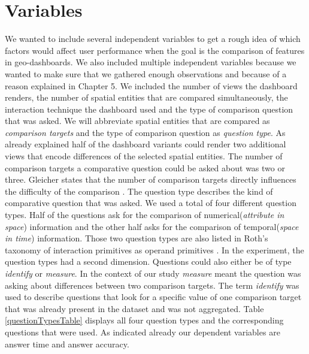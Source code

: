 \section{Variables}
We wanted to include several independent variables to get a rough idea of which factors would affect user performance when the goal
is the comparison of features in geo-dashboards. We also included multiple independent variables because we wanted to make sure that we gathered
enough observations and because of a reason explained in Chapter 5.
We included the number of views the dashboard renders, the number of spatial entities that are compared simultaneously,
the interaction technique the dashboard used and the type of comparison question that was asked. We will abbreviate spatial
entities that are compared as \textit{comparison targets} and the type of comparison question as \textit{question type}. As already
explained half of the dashboard variants could render two additional views that encode differences of the selected spatial entities.
The number of comparison targets a comparative question could be asked about was two or three. Gleicher states that the number of comparison targets
directly influences the difficulty of the comparison \citep*{Gleicher.2018}. The question type describes the kind of comparative question
that was asked. We used a total of four different question types. Half of the questions ask for the comparison of numerical(\textit{attribute in space})
information and the other half asks for the comparison of temporal(\textit{space in time}) information. Those two question types are also listed
in Roth's taxonomy of interaction primitives as operand primitives \citep*{Roth.2013}. In the experiment, the question types had a second dimension.
Questions could also either be of type \textit{identify} or \textit{measure}. In the context of our study \textit{measure} meant the question was asking
about differences between two comparison targets. The term \textit{identify} was used to describe questions that look for a specific value of one
comparison target that was already present in the dataset and was not aggregated. Table \ref{questionTypesTable} displays all four question types and
the corresponding questions that were used.
As indicated already our dependent variables are answer time and answer accuracy.


